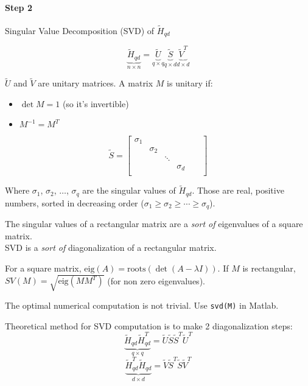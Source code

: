 \newpage
{}

\paragraph{Step 2} Singular Value Decomposition (SVD) of $\tilde{H}_{qd}$

\[
    \underbrace{\tilde{H}_{qd}}_{n\times n} = \underbrace{\tilde{U}}_{q\times q} \underbrace{\tilde{S}}_{q\times d} \underbrace{\tilde{V}^T}_{d\times d}
\]

$\tilde{U}$ and $\tilde{V}$ are unitary matrices. A matrix $M$ is unitary if:
\begin{itemize}
    \item $\det M = 1$ (so it's invertible)
    \item $M^{-1} = M^T$
\end{itemize}

\[
    \tilde{S} = \begin{bmatrix}
        \sigma_1 & & & & &\\
        & \sigma_2 & & & &\\
        & & \ddots & & &\\
        & &  & \sigma_d & &\\
    \end{bmatrix}
\]

Where $\sigma_1$, $\sigma_2$, $\ldots$, $\sigma_q$ are the singular values of $\tilde{H}_{qd}$.
Those are real, positive numbers, sorted in decreasing order ($\sigma_1 \ge \sigma_2 \ge \cdots \ge \sigma_q$).

\begin{remark}
    The singular values of a rectangular matrix are a \emph{sort of} eigenvalues of a square matrix.\\
    SVD is a \emph{sort of} diagonalization of a rectangular matrix.
\end{remark}

\begin{remark}
    For a square matrix, $\text{eig}(A) = \text{roots}(\det(A-\lambda I))$. If $M$ is rectangular, $SV(M) = \sqrt{\text{eig}(MM^T)}$ (for non zero eigenvalues).
\end{remark}

\begin{remark}
    The optimal numerical computation is not trivial. Use \texttt{svd(M)} in Matlab.

    Theoretical method for SVD computation is to make 2 diagonalization steps:
    \[
        \underbrace{\tilde{H}_{qd} \tilde{H}_{qd}^T}_{q\times q} = \tilde{U}\tilde{S}\tilde{S}^T\tilde{U}^T
    \]
    \[
        \underbrace{\tilde{H}_{qd}^T \tilde{H}_{qd}}_{d\times d} = \tilde{V}\tilde{S}^T\tilde{S}\tilde{V}^T
    \]
\end{remark}

